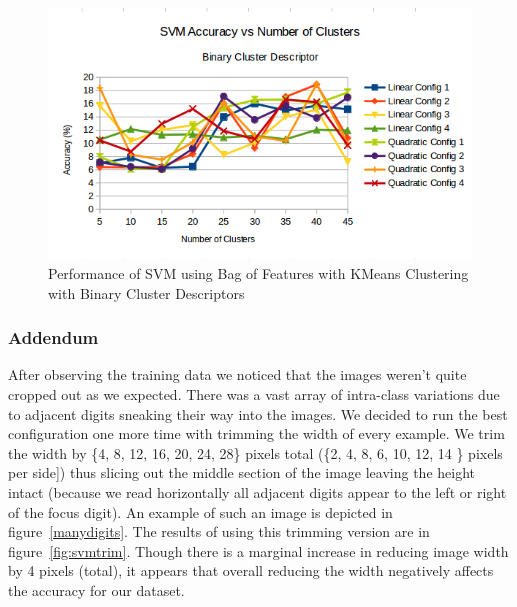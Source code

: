 \documentclass{article} %
\begin{document}
\begin{figure}
\centering
	\includegraphics[width=0.9\linewidth]{./plots/svm/clusterbinary}
    	\caption{Performance of SVM using Bag of Features with KMeans Clustering with Binary Cluster Descriptors}
	\label{fig:clusterbinary}
\end{figure}

\subsubsection{Addendum}
After observing the training data we noticed that the images weren't quite cropped out as we expected.  There was a vast array of intra-class variations due to adjacent digits sneaking their way into the images.  We decided to run the best configuration one more time with trimming the width of every example.  We trim the width by \{4, 8, 12, 16, 20, 24, 28\} pixels total (\{2, 4, 8, 6, 10, 12, 14 \} pixels per side]) thus slicing out the middle section of the image leaving the height intact (because we read horizontally all adjacent digits appear to the left or right of the focus digit).  An example of such an image is depicted in figure~\ref{manydigits}.  The results of using this trimming version are in figure~\ref{fig:svmtrim}. Though there is a marginal increase in reducing image width by 4 pixels (total), it appears that overall reducing the width negatively affects the accuracy for our dataset.
\end{document}
